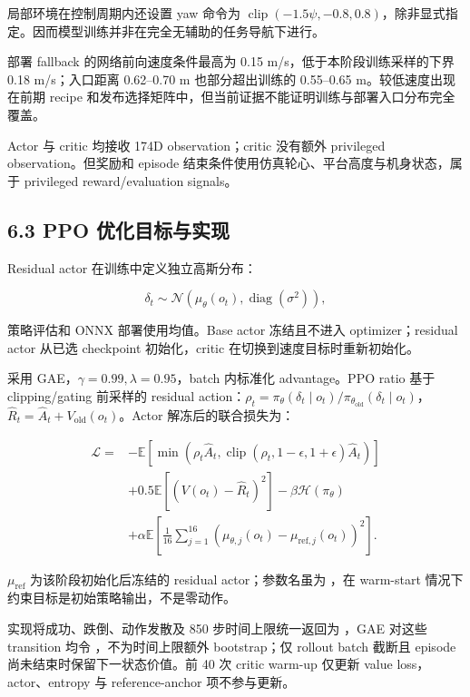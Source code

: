 \documentclass[
  10pt,
  a4paper,
]{article}
\begin{document}
局部环境在控制周期内还设置 yaw 命令为
\(\operatorname{clip}(-1.5\psi,-0.8,0.8)\)，除非显式指定。因而模型训练并非在完全无辅助的任务导航下进行。

部署 fallback 的网络前向速度条件最高为 0.15
m/s，低于本阶段训练采样的下界 0.18 m/s；入口距离 0.62--0.70 m
也部分超出训练的 0.55--0.65 m。较低速度出现在前期 recipe
和发布选择矩阵中，但当前证据不能证明训练与部署入口分布完全覆盖。

Actor 与 critic 均接收 174D observation；critic 没有额外 privileged
observation。但奖励和 episode
结束条件使用仿真轮心、平台高度与机身状态，属于 privileged
reward/evaluation signals。

\subsection{6.3 PPO
优化目标与实现}\label{ppo-ux4f18ux5316ux76eeux6807ux4e0eux5b9eux73b0}

Residual actor 在训练中定义独立高斯分布：

\[
\delta_t\sim\mathcal N(\mu_\theta(o_t),\operatorname{diag}(\sigma^2)),
\]

策略评估和 ONNX 部署使用均值。Base actor 冻结且不进入
optimizer；residual actor 从已选 checkpoint 初始化，critic
在切换到速度目标时重新初始化。

采用 GAE，\(\gamma=0.99,\lambda=0.95\)，batch 内标准化 advantage。PPO
ratio 基于 clipping/gating 前采样的 residual
action：\(\rho_t=\pi_\theta(\delta_t\mid o_t)/\pi_{\theta_{\mathrm{old}}}(\delta_t\mid o_t)\)，\(\hat R_t=\hat A_t+V_{\mathrm{old}}(o_t)\)。Actor
解冻后的联合损失为：

\[
\begin{aligned}
\mathcal L={}&-\mathbb E\left[\min\left(\rho_t\hat A_t,\operatorname{clip}(\rho_t,1-\epsilon,1+\epsilon)\hat A_t\right)\right]\\
&+0.5\mathbb E\left[(V(o_t)-\hat R_t)^2\right]-\beta\mathcal H(\pi_\theta)\\
&+\alpha\mathbb E\left[\frac{1}{16}\sum_{j=1}^{16}(\mu_{\theta,j}(o_t)-\mu_{\mathrm{ref},j}(o_t))^2\right].
\end{aligned}
\]

\(\mu_{\mathrm{ref}}\) 为该阶段初始化后冻结的 residual actor；参数名虽为
{\ttfamily\small{}}，在 warm-start
情况下约束目标是初始策略输出，不是零动作。

实现将成功、跌倒、动作发散及 850 步时间上限统一返回为
{\ttfamily\small{}}，GAE 对这些 transition 均令
{\ttfamily\small{}}，不为时间上限额外
bootstrap；仅 rollout batch 截断且 episode
尚未结束时保留下一状态价值。前 40 次 critic warm-up 仅更新 value
loss，actor、entropy 与 reference-anchor 项不参与更新。
\end{document}
